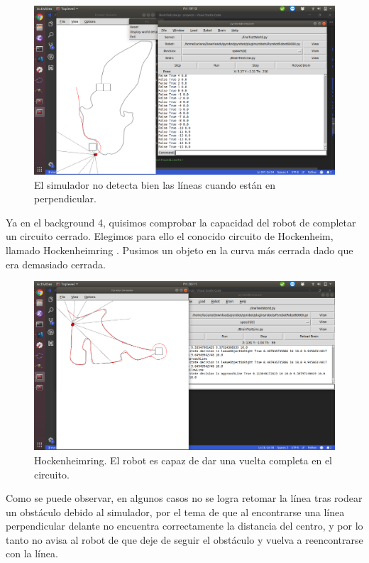 \documentclass{article}
\begin{document}
\begin{figure}[H]
    \centering
    \includegraphics[width=12cm]{mapa3.png}
    \caption{El simulador no detecta bien las líneas cuando están en perpendicular.}
    \label{fig:mapa3}
\end{figure}

Ya en el background 4, quisimos comprobar la capacidad del robot de completar un circuito cerrado. Elegimos para ello el conocido circuito de Hockenheim, llamado Hockenheimring \cite{hockenheimring}. Pusimos un objeto en la curva más cerrada dado que era demasiado cerrada.

\begin{figure}[H]
    \centering
    \includegraphics[width=12cm]{mapa4.png}
    \caption{Hockenheimring. El robot es capaz de dar una vuelta completa en el circuito.}
    \label{fig:mapa4}
\end{figure}

Como se puede observar, en algunos casos no se logra retomar la línea tras rodear un obstáculo debido al simulador, por el tema de que al encontrarse una línea perpendicular delante  no encuentra correctamente la distancia del centro, y por lo tanto no avisa al robot de que deje de seguir el obstáculo y vuelva a reencontrarse con la línea.
\end{document}
